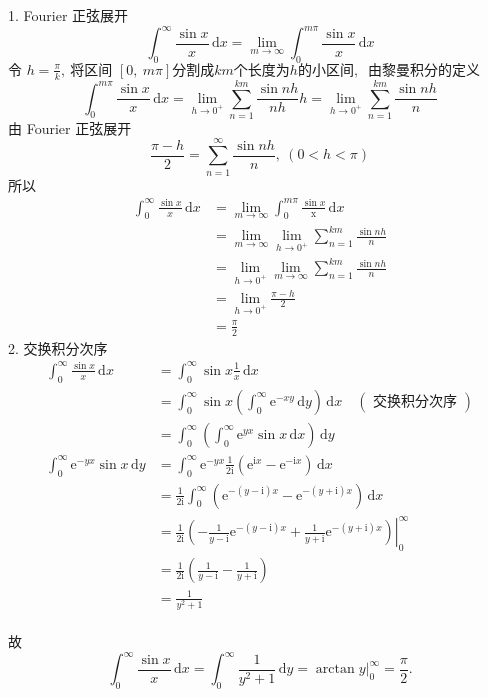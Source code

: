 	\begin{solution}
		1. Fourier 正弦展开
		$$\int_{0}^{\infty} \frac{\sin x}{x}\,\mathrm{d}x=\lim_{m \rightarrow \infty} \int_{0}^{m\pi} \frac{\sin x}{x}\,\mathrm{d}x$$
		$\text{令 } h=\frac{\pi }{k},\  \text{将区间 } [0,\  m\pi]  \text{分割成}km\text{个长度为}h\text{的小区间},\ \text{ 由黎曼积分的定义}$
		$$\int_{0}^{m\pi} \frac{\sin x}{x}\,\mathrm{d}x=\lim\limits_{h \rightarrow 0^{+}} \sum_{n=1}^{km} \frac{\sin nh}{nh}h=\lim\limits_{h \rightarrow 0^{+}} \sum_{n=1}^{km} \frac{\sin nh}{n}$$
		由 Fourier 正弦展开	
		$$\frac{\pi-h}{2}=\sum_{n=1}^{\infty} \frac{\sin nh}{n},\ (0<h<\pi)$$
		所以
		$$\begin{aligned}
			\int_{0}^{\infty} \frac{\sin x}{x}\,\mathrm{d}x & =\lim\limits_{m\rightarrow \infty} \int_{0}^{m\pi} \frac{\sin x}{\mathrm{x}} \,\mathrm{d}x \\
			& =\lim\limits_{m\rightarrow \infty} \lim\limits_{h \rightarrow 0^{+}} \sum_{n=1}^{km} \frac{\sin nh}{n} \\
			& =\lim\limits_{h \rightarrow 0^{+}} \lim\limits_{m\rightarrow \infty} \sum_{n=1}^{km} \frac{\sin nh}{n} \\
			& =\lim\limits_{h\rightarrow 0^{+}} \frac{\pi-h}{2} \\
			& =\frac{\pi}{2}
		\end{aligned}$$
		2. 交换积分次序
		$$\begin{aligned}
			\int_{0}^{\infty} \frac{\sin x}{x}\,\mathrm{d}x & =\int_{0}^{\infty} \sin x \frac{1}{x}\,\mathrm{d}x \\
			& =\int_{0}^{\infty} \sin x\left(\int_{0}^{\infty} \mathrm{e}^{-xy}\,\mathrm{d}y\right)\,\mathrm{d}x\quad(\text { 交换积分次序 }) \\
			& =\int_{0}^{\infty}\left(\int_{0}^{\infty} \mathrm{e}^{yx} \sin x\,\mathrm{d}x\right)\,\mathrm{d}y \\
			\int_{0}^{\infty} \mathrm{e}^{-yx} \sin x\,\mathrm{d}y & =\int_{0}^{\infty} \mathrm{e}^{-yx} \frac{1}{2 \mathrm{i}}\left(\mathrm{e}^{\mathrm{i}x}-\mathrm{e}^{-\mathrm{i}x}\right)\,\mathrm{d}x\\
			& =\frac{1}{2 \mathrm{i}} \int_{0}^{\infty}\left(\mathrm{e}^{-(y-\mathrm{i}) x}-\mathrm{e}^{-(y+\mathrm{i})x}\right)\,\mathrm{d}x \\
			& =\left.\frac{1}{2 \mathrm{i}}\left(-\frac{1}{y-\mathrm{i}} \mathrm{e}^{-(y-\mathrm{i}) x}+\frac{1}{y+\mathrm{i}} \mathrm{e}^{-(y+\mathrm{i})x}\right)\right|_{0} ^{\infty} \\
			& =\frac{1}{2 \mathrm{i}}\left(\frac{1}{y-\mathrm{i}}-\frac{1}{y+\mathrm{i}}\right) \\
			& =\frac{1}{y^{2}+1}
		\end{aligned}$$\\
		故$$\int_{0}^{\infty}\frac{\sin x}{x}\,\mathrm{d}x=\int_{0}^{\infty} \frac{1}{y^{2}+1} \,\mathrm{d}y=\left.\arctan y\right|_{0} ^{\infty}=\frac{\pi}{2} .$$
		

\end{solution}
